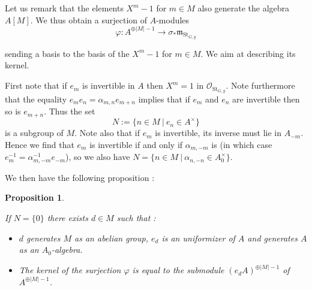 \documentclass{amsart}
\newtheorem{prop}{Proposition}[section]
\theoremstyle{definition}
\theoremstyle{remark}
\begin{document}
Let us remark that the elements $X^m -1$ for $m \in M$ also generate the algebra $A[M]$. We thus obtain a surjection of $A$-modules \[ \varphi : A^{\oplus \vert M \vert -1} {\longrightarrow} \sigma_* {{\mathfrak m}}_{\operatorname{St}_{G,y}} \]

sending a basis to the basis of the $X^m-1$ for $m \in M$. We aim at describing its kernel. 

First note that if $e_m$ is invertible in $A$ then $X^m = 1$ in ${{\mathcal O}}_{\operatorname{St}_{G,y}}$. Note furthermore that the equality $e_me_n=\alpha_{m,n}e_{m+n}$ implies that if $e_m$ and $e_n$ are invertible then so is $e_{m+n}$. Thus the set \[ N := \{ n \in M \ \vert \ e_n \in A^\times \} \] is a subgroup of $M$.
Note also that if $e_m$ is invertible, its inverse must lie in $A_{-m}$. Hence we find that $e_m$ is invertible if and only if $\alpha_{m,-m}$ is (in which case $e_m^{-1} = \alpha_{m,-m}^{-1} e_{-m}$), so we also have $N = \{ n \in M \ \vert \ \alpha_{n,-n} \in A_0^{\times} \}$.

We then have the following proposition : 

\begin{prop}
\label{ram}

If $N = \{0 \}$ there exists $d \in M$ such that : 

\begin{itemize}
\item[(i)] $d$ generates $M$ as an abelian group, $e_d$ is an uniformizer of $A$ and generates $A$ as an $A_0$-algebra.

\item[(ii)] The kernel of the surjection $\varphi$ is equal to the submodule $(e_dA)^{\oplus \vert M \vert -1}$ of $A^{\oplus \vert M \vert -1}$.
\end{itemize}

\end{prop}
\end{document}
